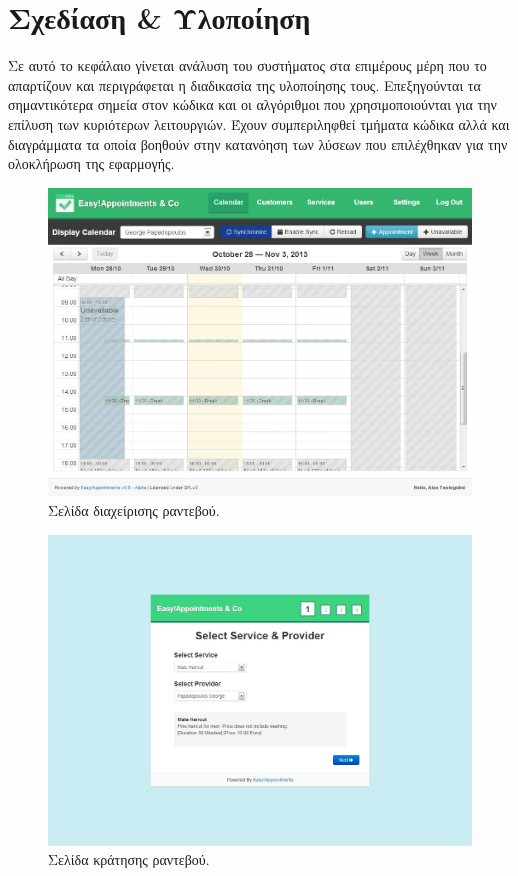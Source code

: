 
\chapter{Σχεδίαση \& Υλοποίηση}
Σε αυτό το κεφάλαιο γίνεται ανάλυση του συστήματος στα επιμέρους μέρη που το απαρτίζουν και περιγράφεται η διαδικασία της υλοποίησης τους. Επεξηγούνται τα σημαντικότερα σημεία στον κώδικα και οι αλγόριθμοι που χρησιμοποιούνται για την επίλυση των κυριότερων λειτουργιών. Έχουν συμπεριληφθεί τμήματα κώδικα αλλά και διαγράμματα τα οποία βοηθούν στην κατανόηση των λύσεων που επιλέχθηκαν για την ολοκλήρωση της εφαρμογής.

\begin{figure}[ht!]
\centering
\includegraphics[width=130mm]{images/backend-calendar.jpg}
\caption{Σελίδα διαχείρισης ραντεβού.}
\label{backend-calendar}
\end{figure}

\begin{figure}[ht!]
\centering
\includegraphics[width=130mm]{images/book-appointment.jpg}
\caption{Σελίδα κράτησης ραντεβού.}
\label{book-appointment}
\end{figure}

